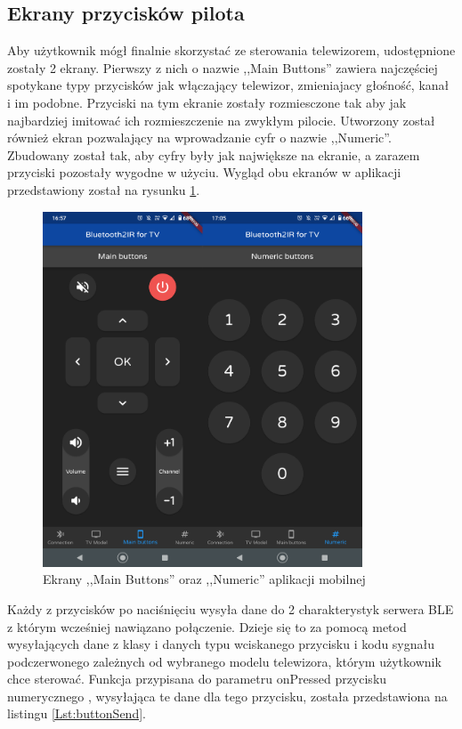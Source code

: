 \documentclass[12pt,twoside]{article}
\begin{document}
\subsection{Ekrany przycisków pilota}
Aby użytkownik mógł finalnie skorzystać ze sterowania telewizorem, udostępnione zostały 2 ekrany. Pierwszy z nich o nazwie ,,Main Buttons'' zawiera najczęściej spotykane typy przycisków jak włączający telewizor, zmieniajacy głośność, kanał i im podobne. Przyciski na tym ekranie zostały rozmiesczone tak aby jak najbardziej imitować ich rozmieszczenie na zwykłym pilocie. 
Utworzony został również ekran pozwalający na wprowadzanie cyfr o nazwie ,,Numeric''. Zbudowany został tak, aby cyfry były jak największe na ekranie, a zarazem przyciski pozostały wygodne w użyciu. Wygląd obu ekranów w aplikacji przedstawiony został na rysunku \ref*{Fig:buttonScreens}.

\begin{figure}[ht]
   \centering
   \includegraphics[width=9.5cm]{images/buttonScreens.png}
   \caption{Ekrany ,,Main Buttons'' oraz ,,Numeric'' aplikacji mobilnej}
   \label{Fig:buttonScreens}
\end{figure}

Każdy z przycisków po naciśnięciu wysyła dane do 2 charakterystyk serwera BLE z którym wcześniej nawiązano połączenie. Dzieje się to za pomocą metod wysyłających dane z klasy  i danych typu wciskanego przycisku i kodu sygnału podczerwonego zależnych od wybranego modelu telewizora, którym użytkownik chce sterować. Funkcja przypisana do parametru onPressed przycisku numerycznego , wysyłająca te dane dla tego przycisku, została przedstawiona na listingu \ref*{Lst:buttonSend}.
\end{document}
